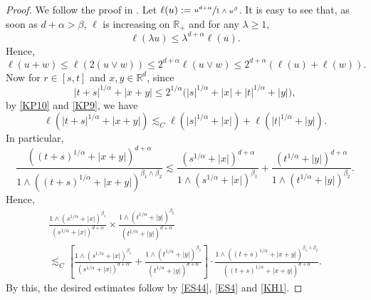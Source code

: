\documentclass[JEP,XML,SOM,Unicode,published]{cedram}
\theoremstyle{plain}
\theoremstyle{definition}
\newcommand\mR{\mathbb{R}}
\newcommand\1{{\mathbf{1}}}
\begin{document}
\begin{proof}
We follow the proof in \cite{Ch-Zh20}.
Let $\ell(u):=\sfrac{u^{d+\alpha}}{1\wedge u^{\beta}}$. It is easy to see that, as soon as $d+\alpha>\beta $, $\ell$ is increasing on $\mR_+$ and
for any $\lambda\geq 1$,
\begin{equation}\label{KP10}
\ell(\lambda u)\leq \lambda^{d+\alpha}\ell(u).
\end{equation}
Hence,\vspace*{-3pt}
\begin{equation}\label{KP9}
\ell(u+w)\leq \ell(2(u\vee w))\leq 2^{d+\alpha}\ell(u\vee w)\leq 2^{d+\alpha}(\ell(u)+\ell(w)).
\end{equation}
Now for $r\in[s,t]$ and $x,y\in\mR^d$, since
\[
|t+s|^{1/\alpha}+|x+y|\leq 2^{1/\alpha}\bigl(|s|^{1/\alpha}+|x|+|t|^{1/\alpha}+|y|\bigr),
\]
by \eqref{KP10} and \eqref{KP9}, we have
\begin{equation*}
\ell(|t+s|^{1/\alpha}+|x+y|)\lesssim_C\ell(|s|^{1/\alpha}+|x|)+\ell(|t|^{1/\alpha}+|y|).
\end{equation*}
In particular,
\begin{equation*}
\frac{((t+s)^{1/\alpha}+|x+y|)^{d+\alpha}}{1\wedge ((t+s)^{1/\alpha}+|x+y|)^{\beta_1\wedge\beta_2}}
\lesssim\frac{(s^{1/\alpha}+|x|)^{d+\alpha}}{1\wedge (s^{1/\alpha}+|x|)^{\beta_1}}
+\frac{(t^{1/\alpha}+|y|)^{d+\alpha}}{1\wedge (t^{1/\alpha}+|y|)^{\beta_2}}.
\end{equation*}
Hence,\vspace*{-3pt}
\begin{multline*}
\frac{1\wedge (s^{1/\alpha}+|x|)^{\beta_1}}{(s^{1/\alpha}+|x|)^{d+\alpha}}\times\frac{1\wedge (t^{1/\alpha}+|y|)^{\beta_2}}{(t^{1/\alpha}+|y|)^{d+\alpha}}\\
\lesssim_C\left[\frac{1\wedge (s^{1/\alpha}+|x|)^{\beta_1}}{(s^{1/\alpha}+|x|)^{d+\alpha}}
+\frac{1\wedge (t^{1/\alpha}+|y|)^{\beta_2}}{(t^{1/\alpha}+|y|)^{d+\alpha}}\right]\cdot\frac{1\wedge ((t+s)^{1/\alpha}+|x+y|)^{\beta_1\wedge\beta_2}}{((t+s)^{1/\alpha}+|x+y|)^{d+\alpha}}.
\end{multline*}
By this, the desired estimates follow by \eqref{ES44}, \eqref{ES4} and \eqref{KH1}.
\end{proof}
\end{document}
